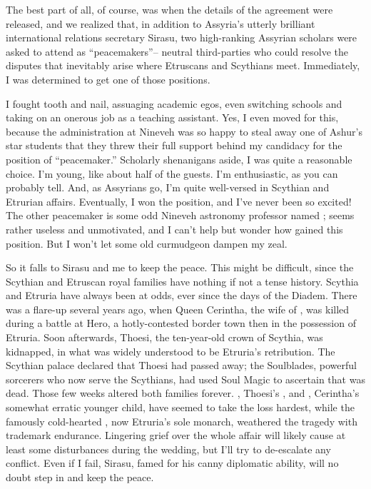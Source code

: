 \documentclass[char]{Kos}
\begin{document}
The best part of all, of course, was when the details of the agreement were released, and we realized that, in addition to Assyria's utterly brilliant international relations secretary Sirasu, two high-ranking Assyrian scholars were asked to attend as ``peacemakers''-- neutral third-parties who could resolve the disputes that inevitably arise where Etruscans and Scythians meet. Immediately, I was determined to get one of those positions.

I fought tooth and nail, assuaging academic egos, even switching schools and taking on an onerous job as a teaching assistant. Yes, I even moved for this, because the administration at Nineveh was so happy to steal away one of Ashur's star students that they threw their full support behind my candidacy for the position of ``peacemaker.'' Scholarly shenanigans aside, I was quite a reasonable choice. I'm young, like about half of the guests. I'm enthusiastic, as you can probably tell. And, as Assyrians go, I'm quite well-versed in Scythian and Etrurian affairs. Eventually, I won the position, and I've never been so excited! The other peacemaker is some odd Nineveh astronomy professor named \cAnarchist{}; \cAnarchist{\they} seems rather useless and unmotivated, and I can't help but wonder how \cAnarchist{\they} gained this position. But I won't let some old curmudgeon dampen my zeal.

So it falls to Sirasu and me to keep the peace. This might be difficult, since the Scythian and Etruscan royal families have nothing if not a tense history. Scythia and Etruria have always been at odds, ever since the days of the Diadem. There was a flare-up several years ago, when Queen Cerintha, the wife of \cEtruriaKing{\Monarch} \cEtruriaKing{}, was killed during a battle at Hero, a hotly-contested border town then in the possession of Etruria. Soon afterwards, Thoesi, the ten-year-old crown \cFugitive{\prince} of Scythia, was kidnapped, in what was widely understood to be Etruria's retribution. The Scythian palace declared that Thoesi had passed away; the Soulblades, powerful sorcerers who now serve the Scythians, had used Soul Magic to ascertain that \cFugitive{\they} was dead. Those few weeks altered both families forever. \cScythiaQueen{}, Thoesi's \cScythiaQueen{\parent}, and \cPoet{}, Cerintha's somewhat erratic younger child, have seemed to take the loss hardest, while the famously cold-hearted \cEtruriaKing{}, now Etruria's sole monarch, weathered the tragedy with \cEtruriaKing{\their} trademark endurance. Lingering grief over the whole affair will likely cause at least some disturbances during the wedding, but I'll try to de-escalate any conflict. Even if I fail, Sirasu, famed for his canny diplomatic ability, will no doubt step in and keep the peace.
\end{document}
